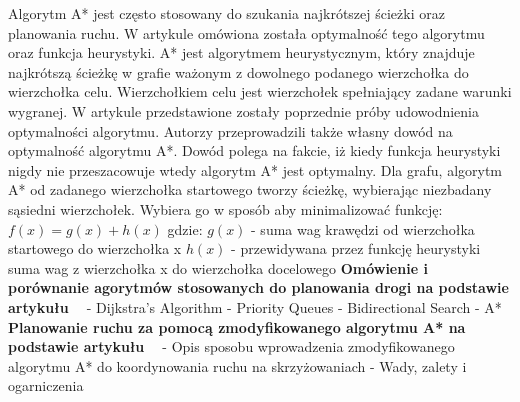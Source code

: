 \indent
Algorytm A* jest często stosowany do szukania najkrótszej ścieżki oraz planowania ruchu. W artykule \cite{dechter1985generalized} omówiona została optymalność tego algorytmu oraz funkcja heurystyki. A* jest algorytmem heurystycznym, który znajduje najkrótszą ścieżkę w grafie ważonym z dowolnego podanego wierzchołka do wierzchołka celu. Wierzchołkiem celu jest wierzchołek spełniający zadane warunki wygranej. W artykule przedstawione zostały poprzednie próby udowodnienia optymalności algorytmu. Autorzy przeprowadzili także własny dowód na optymalność algorytmu A*. Dowód polega na fakcie, iż kiedy funkcja heurystyki nigdy nie przeszacowuje wtedy algorytm A* jest optymalny. Dla grafu, algorytm A* od zadanego wierzchołka startowego tworzy ścieżkę, wybierając niezbadany sąsiedni wierzchołek. Wybiera go w sposób aby minimalizować funkcję:
\newline
\newline
\begin{math} f(x) = g(x) + h(x)\end{math}
\newline
\newline
gdzie:
\newline
\newline
\begin{math} g(x) \end{math} - suma wag krawędzi od wierzchołka startowego do wierzchołka x
\begin{math} h(x) \end{math} - przewidywana przez funkcję heurystyki suma wag z wierzchołka x do wierzchołka docelowego
\newline
\newline
\textbf{Omówienie i porównanie agorytmów stosowanych do planowania drogi na podstawie artykułu ~\cite{delling2009engineering}}
  \newline
  - Dijkstra's Algorithm
  \newline
  - Priority Queues
  \newline
  - Bidirectional Search
  \newline
  - A*
\newline
\newline
\textbf{Planowanie ruchu za pomocą zmodyfikowanego algorytmu A* na podstawie artykułu ~\cite{munteanmobile}}
  \newline
  - Opis sposobu wprowadzenia zmodyfikowanego algorytmu A* do koordynowania ruchu na skrzyżowaniach
  \newline
  - Wady, zalety i ogarniczenia
\newline
